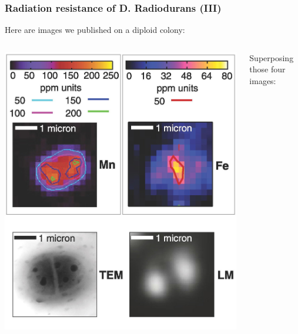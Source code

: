 \begin{frame}
  \frametitle{Radiation resistance of D. Radiodurans (III)}

  Here are images we published on a diploid colony:

  \bigskip

  \begin{columns}
    \begin{column}{0.5\linewidth}
      \includegraphics[width=\linewidth]{xrf/dr_4maps.jpg}
    \end{column}
    \begin{column}{0.5\linewidth}
      Superposing those four images:\\[1ex]

\end{column}
\end{columns}
\end{frame}
